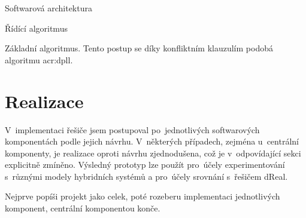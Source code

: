 \documentclass[thesis=M,czech]{FITthesis}[2012/06/26]
\newcommand{\acrlabel}[1]{acr:#1}
\newcommand{\acr}[1]{\acrshort{\acrlabel{#1}}}
\begin{document}
\begin{section}{Softwarová architektura}
\begin{subsection}{Řídící algoritmus}
\begin{paragraph}{Základní algoritmus.}
Tento postup se díky konfliktním klauzulím
podobá algoritmu \acr{dpll}.
\end{paragraph} %


\end{subsection} %


\end{section} %



\chapter{Realizace}\label{ch:impl}
V~implementaci řešiče jsem postupoval
po~jednotlivých softwarových komponentách
podle jejich návrhu.
V~některých případech,
zejména u~centrální komponenty,
je realizace oproti návrhu zjednodušena,
což je v~odpovídající sekci explicitně zmíněno.
Výsledný prototyp lze použít
pro~účely experimentování s~různými modely hybridních systémů
a pro~účely srovnání s~řešičem dReal.

Nejprve popíši projekt jako celek,
poté rozeberu implementaci jednotlivých komponent,
centrální komponentou konče.

\end{document}
